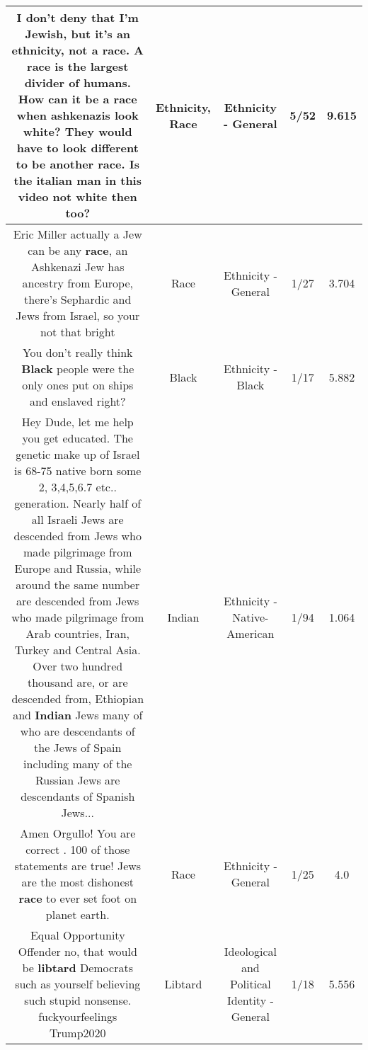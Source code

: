 \documentclass[11pt]{article}
\newlength\mylength
\begin{document}
\begin{center}
\begin{longtable}{|C{.65\mylength}|C{.30\mylength}|C{.12\mylength}|C{.12\mylength}|C{.12\mylength}|}
  \small I don't deny that I'm Jewish, but it's an \textbf{ethnicity}, not a \textbf{race}. A \textbf{race} is the largest divider of humans. How can it be a \textbf{race} when ashkenazis look white? They would have to look different to be another \textbf{race}. Is the italian man in this video not white then too?\normalsize   & Ethnicity, Race & Ethnicity - General & 5/52 & 9.615 \\  \hline
  \small Eric Miller actually a Jew can be any \textbf{race}, an Ashkenazi Jew has ancestry from Europe, there's Sephardic and Jews from Israel, so your not that bright\normalsize   & Race & Ethnicity - General & 1/27 & 3.704 \\  \hline
  \small {} You don't really think \textbf{Black} people were the only ones put on ships and enslaved right?\normalsize   & Black & Ethnicity - Black & 1/17 & 5.882 \\  \hline
  \small Hey Dude, let me help you get educated. The genetic make up of Israel is 68-75 native born some  2, 3,4,5,6.7 etc.. generation. Nearly half of all Israeli Jews are descended from Jews who made pilgrimage from Europe and Russia, while around the same number are descended from Jews who made pilgrimage  from Arab countries, Iran, Turkey and Central Asia. Over two hundred thousand are, or are descended from, Ethiopian and \textbf{Indian} Jews many of who are descendants of the Jews of Spain including many of the Russian Jews are descendants of Spanish Jews...\normalsize   & Indian & Ethnicity - Native-American & 1/94 & 1.064 \\  \hline
  \small Amen Orgullo! You are correct . 100 of those statements are true!  Jews are the most dishonest \textbf{race} to ever set foot on planet earth.\normalsize   & Race & Ethnicity - General & 1/25 & 4.0 \\  \hline
  \small Equal Opportunity Offender no, that would be \textbf{libtard} Democrats such as yourself believing such stupid nonsense. fuckyourfeelings Trump2020\normalsize   & Libtard &  Ideological and Political Identity - General & 1/18 & 5.556 \\  \hline

\end{longtable}
\end{center}
\end{document}
